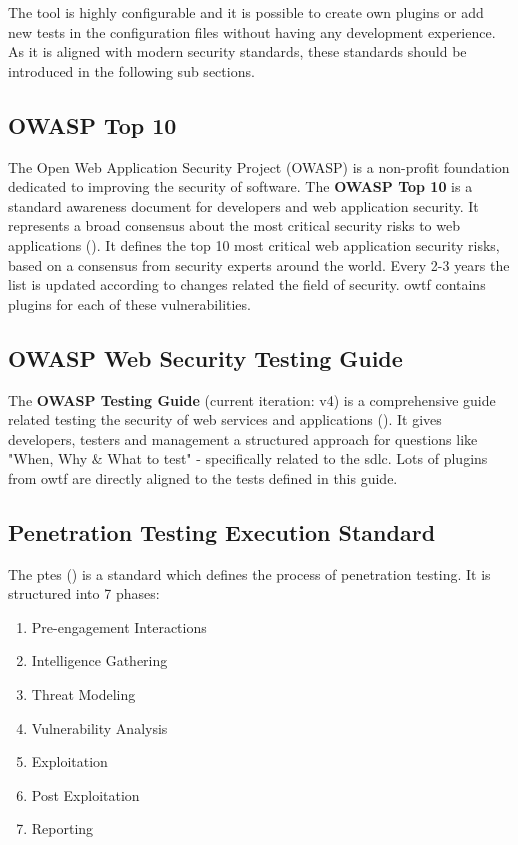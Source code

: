
The tool is highly configurable and it is possible to create own plugins or add new tests in the configuration files without having any development experience. As it is aligned with modern security standards, these standards should be introduced in the following sub sections.

\subsection{OWASP Top 10}

The Open Web Application Security Project (OWASP) is a non-profit foundation dedicated to improving the security of software. The \textbf{OWASP Top 10} is a standard awareness document for developers and web application security. It represents a broad consensus about the most critical security risks to web applications (\cite{Top10.11.06.2021}). It defines the top 10 most critical web application security risks, based on a consensus from security experts around the world. Every 2-3 years the list is updated according to changes related the field of security. \ac{owtf} contains plugins for each of these vulnerabilities.

\subsection{OWASP Web Security Testing Guide}

The \textbf{OWASP Testing Guide} (current iteration: v4) is a comprehensive guide related testing the security of web services and applications (\cite{Guide.11.06.2021}). It gives developers, testers and management a structured approach for questions like "When, Why \& What to test" - specifically related to the \ac{sdlc}. Lots of plugins from \ac{owtf} are directly aligned to the tests defined in this guide.

\subsection{Penetration Testing Execution Standard}

The \ac{ptes} (\cite{PTES.11.06.2021}) is a standard which defines the process of penetration testing. It is structured into 7 phases: 

\begin{enumerate}
	\item Pre-engagement Interactions
	\item Intelligence Gathering
	\item Threat Modeling
	\item Vulnerability Analysis
	\item Exploitation
	\item Post Exploitation
	\item Reporting
\end{enumerate}

